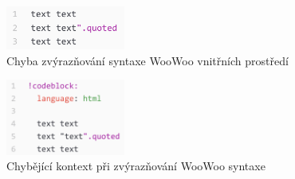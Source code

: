 \begin{figure}\centering
    \includegraphics[width=0.35\textwidth]{content/realizace/zvýrazňování-syntaxe-chyba-1}
 	\caption[Chyba zvýrazňování syntaxe vnitřních prostředí]{Chyba zvýrazňování syntaxe WooWoo vnitřních prostředí}
    \label{zvyraznovani-syntaxe-chyba-1}
\end{figure}

\begin{figure}\centering
    \includegraphics[width=0.35\textwidth]{content/realizace/zvýrazňování-syntaxe-chyba-2}
 	\caption[Chybějící kontext při zvýrazňování WooWoo syntaxe]{Chybějící kontext při zvýrazňování WooWoo syntaxe}
    \label{zvyraznovani-syntaxe-chyba-2}
\end{figure}
